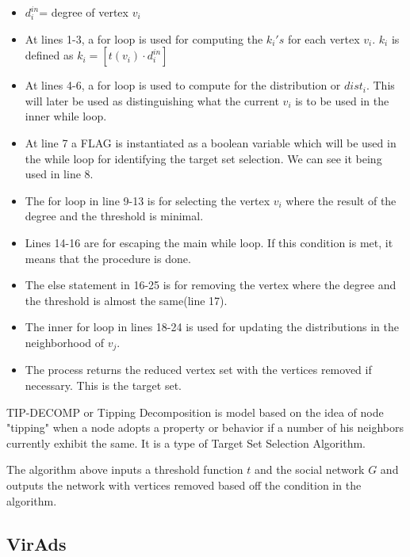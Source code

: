 \begin{itemize}
	\item $d_{i}^{in}$= degree of vertex $v_{i}$
	\item At lines 1-3, a for loop is used for computing the $k_{i}'s$ for each vertex $v_{i}$. $k_{i}$ is defined as  $k_{i}=[t(v_{i})\cdot d_{i}^{in}]$
	\item At lines 4-6, a for loop is used to compute for the distribution or $dist_{i}$. This will later be used as distinguishing what the current $v_{i}$ is to be used in the inner while loop.
	\item At line 7 a FLAG is instantiated as a boolean variable which will be used in the while loop for identifying the target set selection. We can see it being used in line 8.
	\item The for loop in line 9-13 is for selecting the vertex $v_{i}$ where the result of the degree and the threshold is minimal.
	\item Lines 14-16 are for escaping the main while loop. If this condition is met, it means that the procedure is done.
	\item The else statement in 16-25 is for removing the vertex where the degree and the threshold is almost the same(line 17).
	\item The inner for loop in lines 18-24 is used for updating the distributions in the neighborhood of $v_{j}$.
	\item The process returns the reduced vertex set with the vertices removed if necessary. This is the target set.
\end{itemize}
TIP-DECOMP or Tipping Decomposition is model based on the idea of node "tipping" when a node adopts a property or behavior if a number of his neighbors currently exhibit the same. It is a type of Target Set Selection Algorithm. 

The algorithm above inputs a threshold function $t$ and the social network $G$ and outputs the network with vertices removed based off the condition in the algorithm.\cite{tipdecomp}
\subsection{VirAds} 


